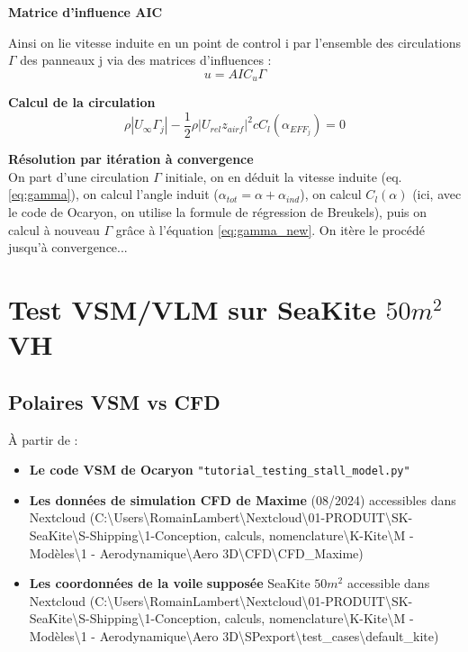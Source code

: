 \documentclass[conference]{IEEEtran}
\begin{document}
\textbf{Matrice d'influence AIC}

Ainsi on lie vitesse induite en un point de control i par l'ensemble des circulations $\Gamma$ des panneaux j via des matrices d'influences : 
\begin{equation}
    u = AIC_u \Gamma
    \label{eq:gamma}
\end{equation}

\textbf{Calcul de la circulation}
\begin{equation}
    \rho |U_{\infty} \Gamma_j| - \frac{1}{2} \rho |U_{rel} z_{airf}|^2 c C_l(\alpha_{EFF_j}) = 0
    \label{eq:gamma_new}
\end{equation}

\textbf{Résolution par itération à convergence}\\
On part d'une circulation $\Gamma$ initiale, on en déduit la vitesse induite (eq. \ref{eq:gamma}), on calcul l'angle induit ($\alpha_{tot} = \alpha + \alpha_{ind}$), on calcul $C_l(\alpha)$ (ici, avec le code de Ocaryon, on utilise la formule de régression de Breukels), puis on calcul à nouveau $\Gamma$ grâce à l'équation \ref{eq:gamma_new}. On itère le procédé jusqu'à convergence...


\IEEEpeerreviewmaketitle
\section{Test VSM/VLM sur SeaKite $50m^2$ VH}

\subsection{Polaires VSM vs CFD} 
À partir de :
\begin{itemize}
    \item \textbf{Le code VSM de Ocaryon} \texttt{"tutorial\_testing\_stall\_model.py"}
    \item \textbf{Les données de simulation CFD de Maxime} (08/2024) accessibles dans Nextcloud (C:\textbackslash Users\textbackslash RomainLambert\textbackslash Nextcloud\textbackslash 01-PRODUIT\textbackslash SK-SeaKite\textbackslash S-Shipping\textbackslash 1-Conception, calculs, nomenclature\textbackslash K-Kite\textbackslash M - Modèles\textbackslash 1 - Aerodynamique\textbackslash Aero 3D\textbackslash CFD\textbackslash CFD\_Maxime)
    \item \textbf{Les coordonnées de la voile} \textbf{supposée} SeaKite $50m^2$ accessible dans Nextcloud (C:\textbackslash Users\textbackslash RomainLambert\textbackslash Nextcloud\textbackslash 01-PRODUIT\textbackslash SK-SeaKite\textbackslash S-Shipping\textbackslash 1-Conception, calculs, nomenclature\textbackslash K-Kite\textbackslash M - Modèles\textbackslash 1 - Aerodynamique\textbackslash Aero 3D\textbackslash SPexport\textbackslash test\_cases\textbackslash default\_kite)
\end{itemize} 
\end{document}

